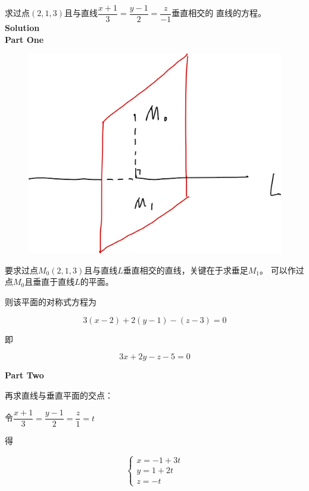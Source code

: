\documentclass[12pt, a4paper]{article}
\numberwithin{equation}{section}
\begin{document}
    求过点\(\left(2,1,3\right)\)且与直线$\dfrac{x+1}{3}=\dfrac{y-1}{2}=\dfrac{z}{-1}$垂直相交的
    直线的方程。
    \\

    \textbf{Solution}
    \\

    \textbf{Part One}

    \begin{figure}
        \centering
        \includegraphics[scale=0.08]{"Chapter 08 images/pic1.png"}
        \label{pic1}
    \end{figure}

    要求过点\(M_{0}\left(2,1,3\right)\)且与直线$L$垂直相交的直线，关键在于求垂足\(M_1\)。
    可以作过点\(M_{0}\)且垂直于直线$L$的平面。

    则该平面的对称式方程为

    \[
        3(x-2)+2(y-1)-(z-3)=0
    \]

    即

    \[
        3x + 2y -z -5 =0
    \]

    \textbf{Part Two}

    再求直线与垂直平面的交点：

    令$\dfrac{x+1}{3}=\dfrac{y-1}{2}=\dfrac{z}{1}=t$

    得

    $$
        \left\{\begin{array}{l}
        x=-1+3 t \\
        y=1+2 t \\
        z=-t
        \end{array}\right.
    $$
\end{document}
